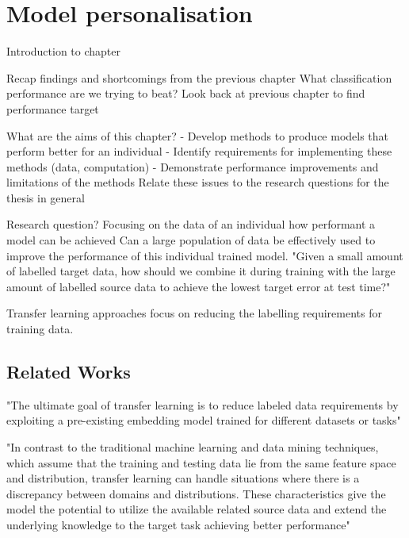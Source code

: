 \chapter{Model personalisation}
\label{chp:personalisation}
Introduction to chapter

Recap findings and shortcomings from the previous chapter
What classification performance are we trying to beat? Look back at previous chapter to find performance target

What are the aims of this chapter?
- Develop methods to produce models that perform better for an individual 
- Identify requirements for implementing these methods (data, computation)
- Demonstrate performance improvements and limitations of the methods
Relate these issues to the research questions for the thesis in general

Research question?
Focusing on the data of an individual how performant a model can be achieved
Can a large population of data be effectively used to improve the performance of this individual trained model. "Given a small amount of labelled target data, how should we combine it during training with the large amount of labelled source data to achieve the lowest target error at test time?"



Transfer learning approaches focus on reducing the labelling requirements for training data.


\section{Related Works} %
"The ultimate goal of transfer learning is to reduce labeled data requirements by exploiting a pre-existing embedding model trained for different datasets or tasks" \cite{Shor2020}

"In contrast to the traditional machine learning and data mining techniques, which assume that the training and testing data lie from the same feature space and distribution, transfer learning can handle situations where there is a discrepancy between domains and distributions. These characteristics give the model the potential to utilize the available related source data and extend the underlying knowledge to the target task achieving better performance"\cite{Farahani2020}

